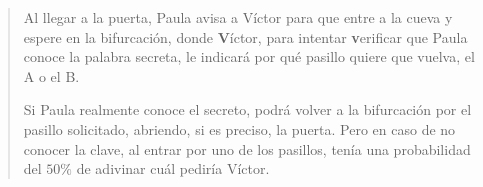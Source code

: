 \begin{quote}
	Al llegar a la puerta, Paula avisa a Víctor para que entre a la cueva y espere en la bifurcación, donde \textbf{V}íctor, para intentar \textbf{v}erificar que Paula conoce la palabra secreta, le indicará por qué pasillo quiere que vuelva, el A o el B.
	
	
	
	Si Paula realmente conoce el secreto, podrá volver a la bifurcación por el pasillo solicitado, abriendo, si es preciso, la puerta.
	Pero en caso de no conocer la clave, al entrar por uno de los pasillos, tenía una probabilidad del $50\%$ de adivinar cuál pediría Víctor.
	
	
	

\end{quote}
